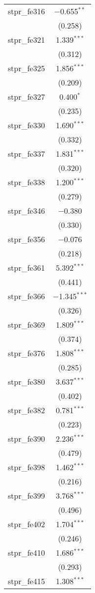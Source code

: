 \begin{table}[!htbp]
\begin{tabular}{@{\extracolsep{5pt}}lc}
  stpr\_fe316 & $-$0.655$^{**}$ \\ 
  & (0.258) \\ 
  stpr\_fe321 & 1.339$^{***}$ \\ 
  & (0.312) \\ 
  stpr\_fe325 & 1.856$^{***}$ \\ 
  & (0.209) \\ 
  stpr\_fe327 & 0.400$^{*}$ \\ 
  & (0.235) \\ 
  stpr\_fe330 & 1.690$^{***}$ \\ 
  & (0.332) \\ 
  stpr\_fe337 & 1.831$^{***}$ \\ 
  & (0.320) \\ 
  stpr\_fe338 & 1.200$^{***}$ \\ 
  & (0.279) \\ 
  stpr\_fe346 & $-$0.380 \\ 
  & (0.330) \\ 
  stpr\_fe356 & $-$0.076 \\ 
  & (0.218) \\ 
  stpr\_fe361 & 5.392$^{***}$ \\ 
  & (0.441) \\ 
  stpr\_fe366 & $-$1.345$^{***}$ \\ 
  & (0.326) \\ 
  stpr\_fe369 & 1.809$^{***}$ \\ 
  & (0.374) \\ 
  stpr\_fe376 & 1.808$^{***}$ \\ 
  & (0.285) \\ 
  stpr\_fe380 & 3.637$^{***}$ \\ 
  & (0.402) \\ 
  stpr\_fe382 & 0.781$^{***}$ \\ 
  & (0.223) \\ 
  stpr\_fe390 & 2.236$^{***}$ \\ 
  & (0.479) \\ 
  stpr\_fe398 & 1.462$^{***}$ \\ 
  & (0.216) \\ 
  stpr\_fe399 & 3.768$^{***}$ \\ 
  & (0.496) \\ 
  stpr\_fe402 & 1.704$^{***}$ \\ 
  & (0.246) \\ 
  stpr\_fe410 & 1.686$^{***}$ \\ 
  & (0.293) \\ 
  stpr\_fe415 & 1.308$^{***}$ \\ 

\end{tabular}
\end{table}
